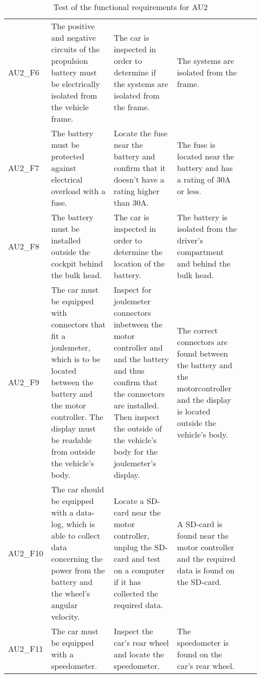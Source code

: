 \begin{table}[h!]
\begin{longtable}{|p{1.6 cm}|p{2.9 cm}|p{2.1 cm}|p{2.1 cm}|p{2.1 cm}|p{1.9 cm}|}
		& \\ \hline
		AU2\_F6 
		& The positive and negative circuits of the propulsion battery  must be electrically isolated from the vehicle frame.
		& The car is inspected in order to determine if the systems are isolated from the frame.
		& The systems are isolated from the frame.
		& 
		& \\ \hline
		AU2\_F7 
		& The battery must be protected against electrical overload with a fuse.
		& Locate the fuse near the battery and confirm that it doesn't have a rating higher than 30A. 
		& The fuse is located near the battery and has a rating of 30A or less. 
		& 
		& \\ \hline
		AU2\_F8 
		& The battery must be installed outside the cockpit behind the bulk head.
		& The car is inspected in order to determine the location of the battery.
		& The battery is isolated from the driver's compartment and behind the bulk head. 
		& 
		& \\ \hline
		AU2\_F9 
		& The car must be equipped with connectors that fit a joulemeter, which is to be located between the battery and the motor controller. The display must be readable from outside the vehicle's body.
		& Inspect for joulemeter connectors inbetween the motor controller and and the battery and thus confirm that the connectors are installed. Then inspect the outside of the vehicle's body for the joulemeter's display.
		& The correct connectors are found between the battery and the motorcontroller and the display is located outside the vehicle's body.
		& 
		& \\ \hline
		AU2\_F10 
		& The car should be equipped with a data-log, which is able to collect data concerning the power from the battery and the wheel's angular velocity.
		& Locate a SD-card near the motor controller, unplug the SD-card and test on a computer if it has collected the required data.  
		& A SD-card is found near the motor controller and the required data is found on the SD-card.
		& 
		& \\ \hline
		AU2\_F11 
		& The car must be equipped with a speedometer.
		& Inspect the car's rear wheel and locate the speedometer.
		& The speedometer is found on the car's rear wheel. 
		& 
		& \\ \hline				
	\end{longtable}
	\caption{Test of the functional requirements for AU2}
\end{table}